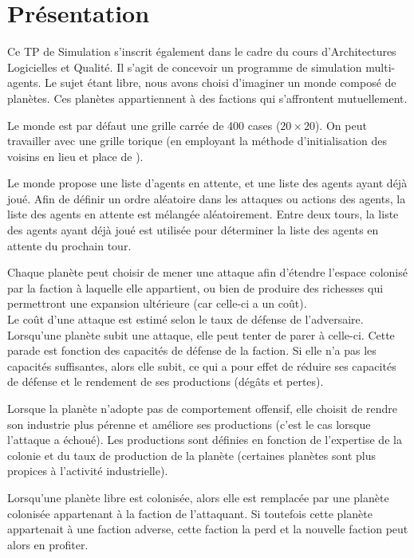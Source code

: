 \chapter{Présentation}

Ce TP de Simulation s’inscrit également dans le cadre du cours d’Architectures Logicielles et Qualité. Il s’agit de concevoir un programme de simulation multi-agents. Le sujet étant libre, nous avons choisi d’imaginer un monde composé de planètes. Ces planètes appartiennent à des factions qui s’affrontent mutuellement. 

Le monde est par défaut une grille carrée de 400 cases ($20 \times 20$). On peut travailler avec une grille torique (en employant la méthode d’initialisation des voisins  en lieu et place de ).

Le monde propose une liste d’agents en attente, et une liste des agents ayant déjà joué. Afin de définir un ordre aléatoire dans les attaques ou actions des agents, la liste des agents en attente est mélangée aléatoirement. Entre deux tours, la liste des agents ayant déjà joué est utilisée pour déterminer la liste des agents en attente du prochain tour.

Chaque planète peut choisir de mener une attaque afin d’étendre l’espace colonisé par la faction à laquelle elle appartient, ou bien de produire des richesses qui permettront une expansion ultérieure (car celle-ci a un coût).\\
Le coût d’une attaque est estimé selon le taux de défense de l’adversaire.\\
Lorsqu’une planète subit une attaque, elle peut tenter de parer à celle-ci. Cette parade est fonction des capacités de défense de la faction. Si elle n’a pas les capacités suffisantes, alors elle subit, ce qui a pour effet de réduire ses capacités de défense et le rendement de ses productions (dégâts et pertes).

Lorsque la planète n’adopte pas de comportement offensif, elle choisit de rendre son industrie plus pérenne et améliore ses productions (c’est le cas lorsque l’attaque a échoué). Les productions sont définies en fonction de l’expertise de la colonie et du taux de production de la planète (certaines planètes sont plus propices à l’activité industrielle).

Lorsqu’une planète libre est colonisée, alors elle est remplacée par une planète colonisée appartenant à la faction de l’attaquant. Si toutefois cette planète appartenait à une faction adverse, cette faction la perd et la nouvelle faction peut alors en profiter.

